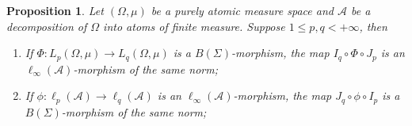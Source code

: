 \documentclass[12pt]{article}
\newtheorem{proposition}[theorem]{Proposition}
\begin{document}
\begin{proposition}\label{SwtchMorphBtwnAtomMeasSp}
    Let $(\Omega,\mu)$ be a purely atomic measure space and $\mathcal{A}$ be a 
    decomposition of $\Omega$ into atoms of finite measure. 
    Suppose $1\leq p,q<+\infty$, then
    \begin{enumerate}[label = (\roman*)]
        \item If $\Phi:L_p(\Omega,\mu)\to L_q(\Omega,\mu)$ is 
        a $B(\Sigma)$-morphism, the map $I_q\circ \Phi\circ J_p$ is 
        an $\ell_\infty(\mathcal{A})$-morphism of the same norm;

        \item If $\phi:\ell_p(\mathcal{A})\to \ell_q(\mathcal{A})$ is 
        an $\ell_\infty(\mathcal{A})$-morphism, the 
        map $J_q\circ \phi\circ I_p$ is a $B(\Sigma)$-morphism of the same norm;
    \end{enumerate} 
\end{proposition}
\end{document}
